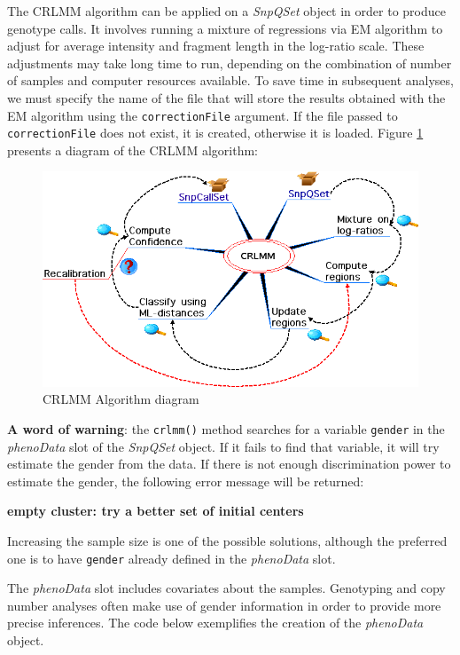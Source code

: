 \documentclass{article}
\newcommand{\Rmethod}[1]{{\texttt{#1}}}
\newcommand{\Robject}[1]{{\texttt{#1}}}
\newcommand{\Rclass}[1]{{\textit{#1}}}
\begin{document}
The CRLMM algorithm \cite{Carvalho2006} can be applied on a
\Rclass{SnpQSet} object in order to produce genotype calls. It involves
running a mixture of regressions via EM algorithm to adjust for average
intensity and fragment length in the log-ratio scale. These adjustments
may take long time to run, depending on the combination of number of
samples and computer resources available. To save time in subsequent
analyses, we must specify the name of the file that will store the
results obtained with the EM algorithm using the
\Robject{correctionFile} argument. If the file passed to
\Robject{correctionFile} does not exist, it is created, otherwise it is
loaded. Figure \ref{crlmm} presents a diagram of the CRLMM algorithm:

\begin{figure}[h]
  \centering
  \includegraphics[scale=.5]{crlmm.png}
  \caption{CRLMM Algorithm diagram}
  \label{crlmm}
\end{figure}

\textbf{A word of warning}: the \Rmethod{crlmm()} method searches for a
variable \Robject{gender} in the \Rclass{phenoData} slot of the
\Rclass{SnpQSet} object. If it fails to find that variable, it will try
estimate the gender from the data. If there is not enough discrimination
power to estimate the gender, the following error message will be
returned:

{\bf empty cluster: try a better set of initial centers}

Increasing the sample size is one of the possible solutions, although
the preferred one is to have \Robject{gender} already defined in the
\Rclass{phenoData} slot.

The \Rclass{phenoData} slot includes covariates about the
samples. Genotyping and copy number analyses often make use of gender
information in order to provide more precise inferences. The code
below exemplifies the creation of the \Rclass{phenoData} object.
\end{document}
